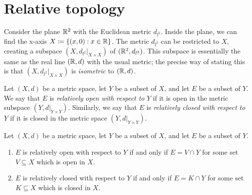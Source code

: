 \section{Relative topology}\label{sec:1.3}

\begin{note}
  Consider the plane \(\mathbb{R}^2\) with the Euclidean metric \(d_{l^2}\).
  Inside the plane, we can find the x-axis \(X \coloneqq \{(x, 0) : x \in \mathbb{R}\}\).
  The metric \(d_{l^2}\) can be restricted to \(X\), creating a subspace \((X, d_{l^2}|_{X \times X})\) of \((\mathbb{R}^2, d_{l^2})\).
  This subspace is essentially the same as the real line \((\mathbb{R}, d)\) with the usual metric;
  the precise way of stating this is that \((X, d_{l^2}|_{X \times X})\) is \emph{isometric} to \((\mathbb{R}, d)\).
\end{note}

\setcounter{thm}{2}
\begin{defn}\label{1.3.3}
  Let \((X, d)\) be a metric space, let \(Y\) be a subset of \(X\), and let \(E\) be a subset of \(Y\).
  We say that \(E\) is \emph{relatively open with respect to \(Y\)} if it is open in the metric subspace \((Y, d|_{Y \times Y})\).
  Similarly, we say that \(E\) is \emph{relatively closed with respect to \(Y\)} if it is closed in the metric space \((Y, d|_{Y \times Y})\).
\end{defn}

\begin{prop}\label{1.3.4}
  Let \((X, d)\) be a metric space, let \(Y\) be a subset of \(X\), and let \(E\) be a subset of \(Y\).
  \begin{enumerate}
    \item \(E\) is relatively open with respect to \(Y\) if and only if \(E = V \cap Y\) for some set \(V \subseteq X\) which is open in \(X\).
    \item \(E\) is relatively closed with respect to \(Y\) if and only if \(E = K \cap Y\) for some set \(K \subseteq X\) which is closed in \(X\).
  \end{enumerate}
\end{prop}

